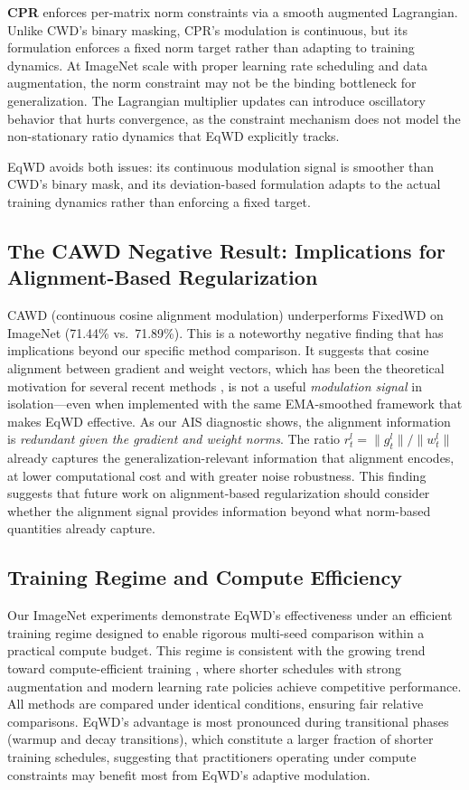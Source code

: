 \documentclass{article}
\begin{document}
\textbf{CPR} enforces per-matrix norm constraints via a smooth augmented
Lagrangian. Unlike CWD's binary masking, CPR's modulation is continuous,
but its formulation enforces a fixed norm target rather than adapting to
training dynamics. At ImageNet scale with proper learning rate
scheduling and data augmentation, the norm constraint may not be the
binding bottleneck for generalization. The Lagrangian multiplier updates can introduce oscillatory behavior that
hurts convergence, as the constraint mechanism does not model the
non-stationary ratio dynamics that EqWD explicitly tracks.

EqWD avoids both issues: its continuous modulation signal is smoother
than CWD's binary mask, and its deviation-based formulation adapts to
the actual training dynamics rather than enforcing a fixed target.

\subsection{The CAWD Negative Result: Implications for Alignment-Based Regularization}
\label{sec:cawd}

CAWD (continuous cosine alignment modulation) underperforms FixedWD on
ImageNet (71.44\% vs.~71.89\%). This is a noteworthy negative finding
that has implications beyond our specific method comparison. It suggests
that cosine alignment between gradient and weight vectors, which has
been the theoretical motivation for several recent methods
\citep{chen2026cwd, sun2025cvpr}, is not a useful \emph{modulation
signal} in isolation---even when implemented with the same EMA-smoothed
framework that makes EqWD effective. As our AIS diagnostic shows, the
alignment information is \emph{redundant given the gradient and weight
norms}. The ratio $r_t^l = \|g_t^l\| / \|w_t^l\|$ already captures the
generalization-relevant information that alignment encodes, at lower
computational cost and with greater noise robustness. This finding
suggests that future work on alignment-based regularization should
consider whether the alignment signal provides information beyond what
norm-based quantities already capture.

\subsection{Training Regime and Compute Efficiency}
\label{sec:training_regime}

Our ImageNet experiments demonstrate EqWD's effectiveness under an
efficient training regime designed to enable rigorous multi-seed
comparison within a practical compute budget. This regime is consistent
with the growing trend toward compute-efficient training
\citep{he2019bag}, where shorter schedules with strong augmentation and
modern learning rate policies achieve competitive performance. All
methods are compared under identical conditions, ensuring fair relative
comparisons. EqWD's advantage is most pronounced during transitional
phases (warmup and decay transitions), which constitute a larger
fraction of shorter training schedules, suggesting that practitioners
operating under compute constraints may benefit most from EqWD's
adaptive modulation.
\end{document}
